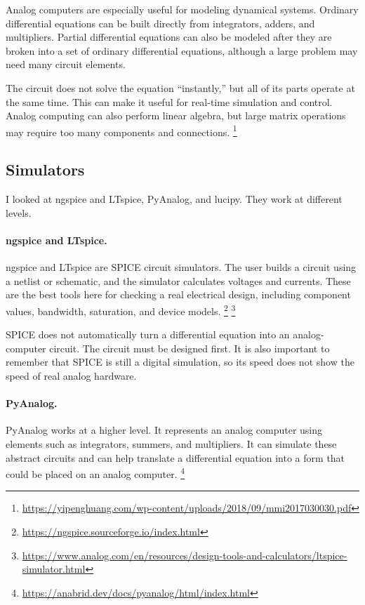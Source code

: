 \documentclass{article}
\begin{document}
Analog computers are especially useful for modeling dynamical systems. Ordinary differential equations can be built directly from integrators, adders, and multipliers. Partial differential equations can also be modeled after they are broken into a set of ordinary differential equations, although a large problem may need many circuit elements.

The circuit does not solve the equation ``instantly,'' but all of its parts operate at the same time. This can make it useful for real-time simulation and control. Analog computing can also perform linear algebra, but large matrix operations may require too many components and connections.
\footnote{\url{https://yipenghuang.com/wp-content/uploads/2018/09/mmi2017030030.pdf}}

\subsection{Simulators}

I looked at ngspice and LTspice, PyAnalog, and lucipy. They work at different levels.

\paragraph{ngspice and LTspice.}
ngspice and LTspice are SPICE circuit simulators. The user builds a circuit using a netlist or schematic, and the simulator calculates voltages and currents. These are the best tools here for checking a real electrical design, including component values, bandwidth, saturation, and device models.
\footnote{\url{https://ngspice.sourceforge.io/index.html}}
\footnote{\url{https://www.analog.com/en/resources/design-tools-and-calculators/ltspice-simulator.html}}

SPICE does not automatically turn a differential equation into an analog-computer circuit. The circuit must be designed first. It is also important to remember that SPICE is still a digital simulation, so its speed does not show the speed of real analog hardware.

\paragraph{PyAnalog.}
PyAnalog works at a higher level. It represents an analog computer using elements such as integrators, summers, and multipliers. It can simulate these abstract circuits and can help translate a differential equation into a form that could be placed on an analog computer.
\footnote{\url{https://anabrid.dev/docs/pyanalog/html/index.html}}
\end{document}
